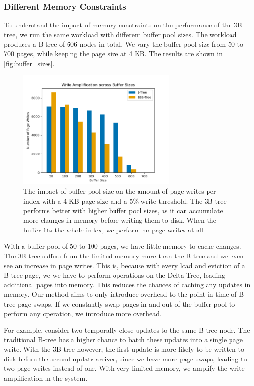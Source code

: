 \subsubsection*{Different Memory Constraints}
To understand the impact of memory constraints on the performance of the 3B-tree, we run the same workload with different buffer pool sizes.
The workload produces a B-tree of 606 nodes in total. We vary the buffer pool size from 50 to 700 pages, while keeping the page size at 4 KB.
The results are shown in \autoref{fig:buffer_sizes}.

\begin{figure}[htbp]
  \centering
  \includegraphics[width=0.7\textwidth]{figures/evaluation/pageviews_buffer_sizes.png}
  \caption{The impact of buffer pool size on the amount of page writes per index with a 4 KB page size and a 5\% write threshold. The 3B-tree performs better with higher buffer pool sizes, as it can accumulate more changes in memory before writing them to disk. When the buffer fits the whole index, we perform no page writes at all.}
  \label{fig:buffer_sizes}
\end{figure}

With a buffer pool of 50 to 100 pages, we have little memory to cache changes.
The 3B-tree suffers from the limited memory more than the B-tree and we even see an increase in page writes.
This is, because with every load and eviction of a B-tree page, we we have to perform operations on the Delta Tree, loading additional pages into memory.
This reduces the chances of caching any updates in memory.
Our method aims to only introduce overhead to the point in time of B-tree page swaps.
If we constantly swap pages in and out of the buffer pool to perform any operation, we introduce more overhead.

For example, consider two temporally close updates to the same B-tree node. 
The traditional B-tree has a higher chance to batch these updates into a single page write.
With the 3B-tree however, the first update is more likely to be written to disk before the second update arrives, since we have more page swaps, leading to two page writes instead of one.
With very limited memory, we amplify the write amplification in the system.

